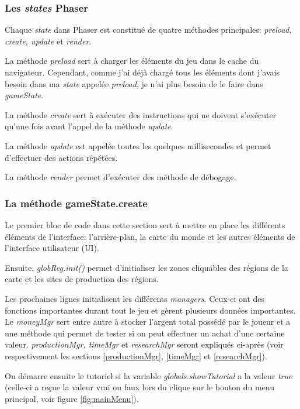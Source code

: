 \documentclass{article}
\begin{document}
		\subsubsection{Les \textit{states} Phaser}
		Chaque \textit{state} dans Phaser est constitué de quatre méthodes principales: \textit{preload, create, update} et \textit{render}. 
		
		
		La méthode \textit{preload} sert à charger les éléments du jeu dans le cache du navigateur. Cependant, comme j'ai déjà chargé tous les éléments dont j'avais besoin dans ma \textit{state} appelée \textit{preload}, je n'ai plus besoin de le faire dans \textit{gameState}.  
		
		
		La méthode \textit{create} sert à exécuter des instructions qui ne doivent s'exécuter qu'une fois avant l'appel de la méthode \textit{update}.
		
		
		La méthode \textit{update} est appelée toutes les quelques millisecondes et permet d'effectuer des actions répétées.
		
		
		La méthode \textit{render} permet d'exécuter des méthode de débogage.
		
		\subsubsection{La méthode gameState.create}
		Le premier bloc de code dans cette section sert à mettre en place les différents éléments de l'interface: l'arrière-plan, la carte du monde et les autres éléments de l'interface utilisateur (UI).
		
		
		Ensuite, \textit{globReg.init()} permet d'initialiser les zones cliquables des régions de la carte et les sites de production des régions.
		
		
		Les prochaines lignes initialisent les différents \textit{managers}. Ceux-ci ont des fonctions importantes durant tout le jeu et gèrent plusieurs données importantes. Le \textit{moneyMgr} sert entre autre à stocker l'argent total possédé par le joueur et a une méthode qui permet de tester si on peut effectuer un achat d'une certaine valeur. \textit{productionMgr, timeMgr} et \textit{researchMgr} seront expliqués ci-après (voir respectivement les sections \ref{productionMgr}, \ref{timeMgr} et \ref{researchMgr}).
		
		
		On démarre ensuite le tutoriel si la variable \textit{globals.showTutorial} a la valeur \textit{true} (celle-ci a reçue la valeur vrai ou faux lors du clique sur le bouton du menu principal, voir figure \ref{fig:mainMenu}).
		
\end{document}

